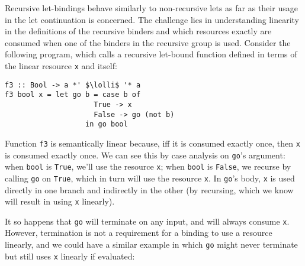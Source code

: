 \documentclass[acmsmall,review,anonymous,screen]{acmart}
\newcommand{\incode}[1]{\lstinline{#1}}
\newcommand{\lolli}{\multimap}
\begin{document}
Recursive let-bindings
behave similarly to non-recursive lets as far as their usage in the let
continuation is concerned.
%
The challenge lies in understanding linearity in the definitions of the
recursive binders and which resources exactly are consumed when one of the
binders in the recursive group is used.
%
Consider the following program, which calls a recursive let-bound function
defined in terms of the linear resource \incode{x} and itself:
%
\begin{notyet}
\begin{lstlisting}
f3 :: Bool -> a *' $\lolli$ '* a
f3 bool x = let go b = case b of
                     True -> x
                     False -> go (not b)
                   in go bool
\end{lstlisting}
\end{notyet}
%
Function \incode{f3} is semantically linear because, iff it is consumed exactly once,
then \incode{x} is consumed exactly once. We can see this by case analysis on \incode{go}'s argument:
when \incode{bool} is \incode{True}, we'll use the resource \incode{x};
 when \incode{bool} is \incode{False}, we recurse by calling \incode{go} on \incode{True}, which in turn will use the resource \incode{x}.
In \incode{go}'s body, \incode{x} is used directly in one branch and indirectly in the
other (by recursing, which we know will result in using \incode{x} linearly).
%

It so happens that \incode{go} will terminate on any input, and will always consume
\incode{x}. However, termination is not a requirement for a binding to use a resource linearly,
and we could have a similar example in which \incode{go} might never terminate but still
uses \incode{x} linearly if evaluated:
\end{document}
